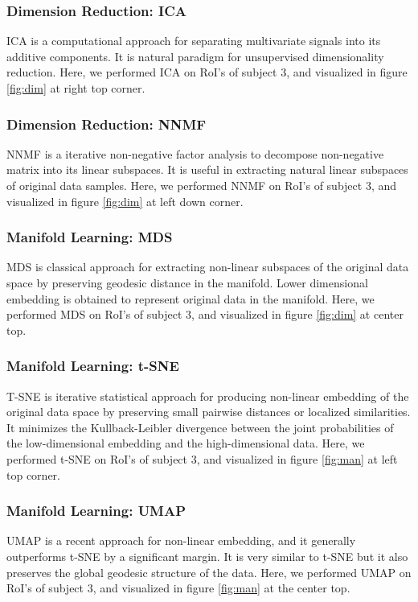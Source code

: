 \documentclass[10pt, twocolumn, letterpaper]{article}
\begin{document}
\subsubsection{Dimension Reduction: ICA}
ICA is a computational approach for separating multivariate signals into its additive components. It is natural paradigm for unsupervised dimensionality reduction. Here, we performed ICA on RoI's of subject 3, and visualized in figure \ref{fig:dim} at right top corner.

\subsubsection{Dimension Reduction: NNMF}
NNMF is a iterative non-negative factor analysis to decompose non-negative matrix into its linear subspaces. It is useful in extracting natural linear subspaces of original data samples. Here, we performed NNMF on RoI's of subject 3, and visualized in figure \ref{fig:dim} at left down corner. 

\subsubsection{Manifold Learning: MDS}
MDS is classical approach for extracting non-linear subspaces of the original data space by preserving geodesic distance in the manifold. Lower dimensional embedding is obtained to represent original data in the manifold. Here, we performed MDS on RoI's of subject 3, and visualized in figure \ref{fig:dim} at center top. 

\subsubsection{Manifold Learning: t-SNE}
T-SNE is iterative statistical approach for producing non-linear embedding of the original data space by preserving small pairwise distances or localized similarities. It minimizes the Kullback-Leibler divergence between the joint probabilities of the low-dimensional embedding and the high-dimensional data. Here, we performed t-SNE on RoI's of subject 3, and visualized in figure \ref{fig:man} at left top corner. 

\subsubsection{Manifold Learning: UMAP}
UMAP is a recent approach for non-linear embedding, and it generally outperforms t-SNE by a significant margin. It is very similar to t-SNE but it also preserves the global geodesic structure of the data. Here, we performed UMAP on RoI's of subject 3, and visualized in figure \ref{fig:man} at the center top. 
\end{document}

